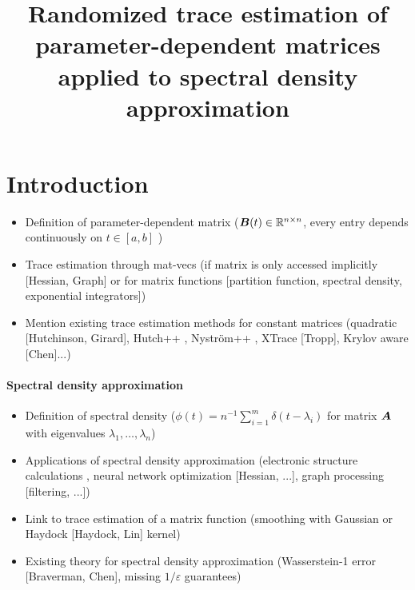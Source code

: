 \documentclass[12pt]{article}
\title{Randomized trace estimation of parameter-dependent matrices applied to spectral density approximation}
\begin{document}
\maketitle


\begin{abstract}
\end{abstract}

\section{Introduction}
\label{sec:introduction}

\begin{itemize}
    \item Definition of parameter-dependent matrix ($\boldsymbol{B}(t) \in \mathbb{R}^{n \times n}$, every entry depends continuously on $t \in [a,b]$ \cite{kressner-2023-randomized-lowrank})
    \item Trace estimation through mat-vecs (if matrix is only accessed implicitly [Hessian, Graph] or for matrix functions [partition function, spectral density, exponential integrators])
    \item Mention existing trace estimation methods for constant matrices (quadratic [Hutchinson, Girard], Hutch++ \cite{meyer-2021-hutch-optimal}, Nyström++ \cite{persson-2022-improved-variants}, XTrace [Tropp], Krylov aware [Chen]...)
\end{itemize}

\paragraph{Spectral density approximation}
\begin{itemize}
    \item Definition of spectral density ($\phi(t) = n^{-1}\sum_{i=1}^{m} \delta(t - \lambda_i)$ for matrix $\boldsymbol{A}$ with eigenvalues $\lambda_1, \dots, \lambda_n$)
    \item Applications of spectral density approximation (electronic structure calculations \cite{lin-2017-randomized-estimation}, neural network optimization [Hessian, ...], graph processing [filtering, ...])
    \item Link to trace estimation of a matrix function (smoothing with Gaussian \cite{lin-2017-randomized-estimation} or Haydock [Haydock, Lin] kernel)
    \item Existing theory for spectral density approximation (Wasserstein-1 error [Braverman, Chen], missing $1/\varepsilon$ guarantees)
\end{itemize}
\end{document}
